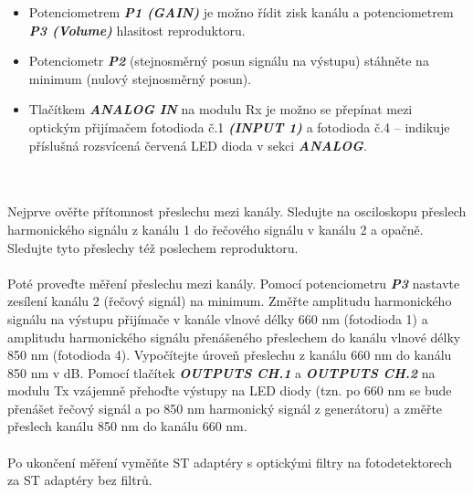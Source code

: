 \begin{itemize}
\item Potenciometrem \textbf{\textit{P1 (GAIN)}} je možno řídit zisk kanálu a potenciometrem \textbf{\textit{P3 (Volume)}} hlasitost reproduktoru.
\item Potenciometr \textbf{\textit{P2}} (stejnosměrný posun signálu na výstupu) stáhněte na minimum (nulový stejnosměrný posun).
\item Tlačítkem \textbf{\textit{ANALOG IN}} na modulu Rx je možno se přepínat mezi optickým přijímačem fotodioda č.1 \textbf{\textit{(INPUT 1)}} a fotodioda č.4 – indikuje příslušná rozsvícená červená LED dioda v sekci \textbf{\textit{ANALOG}}.
\end{itemize}
\\\\
Nejprve ověřte přítomnost přeslechu mezi kanály. Sledujte na osciloskopu přeslech harmonického signálu z kanálu 1 do řečového signálu v kanálu 2 a opačně. Sledujte tyto přeslechy též poslechem reproduktoru.
\\\\
Poté proveďte měření přeslechu mezi kanály. Pomocí potenciometru \textbf{\textit{P3}} nastavte zesílení kanálu 2 (řečový signál) na minimum. Změřte amplitudu harmonického signálu na výstupu přijímače v kanále vlnové délky 660 nm (fotodioda 1) a amplitudu harmonického signálu přenášeného přeslechem do kanálu vlnové délky 850 nm (fotodioda 4). Vypočítejte úroveň přeslechu z kanálu 660 nm do kanálu 850 nm v dB. Pomocí tlačítek \textbf{\textit{OUTPUTS CH.1}} a \textbf{\textit{OUTPUTS CH.2}} na modulu Tx vzájemně přehoďte výstupy na LED diody (tzn. po 660 nm se bude přenášet řečový signál a po 850 nm harmonický signál z generátoru) a změřte přeslech kanálu 850 nm do kanálu 660 nm.
\\\\
Po ukončení měření vyměňte ST adaptéry s optickými filtry na fotodetektorech za ST adaptéry bez filtrů.
\textbf{\textit{}}